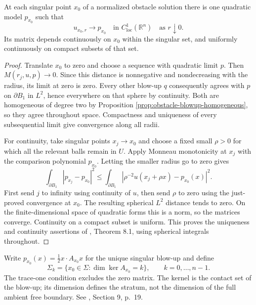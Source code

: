 \begin{theorem}\label{thm:obstacle-singular-uniqueness}
At each singular point $x_0$ of a normalized obstacle solution there is one quadratic model $p_{x_0}$ such that
\[
 u_{x_0,r}\longrightarrow p_{x_0}\quad\text{in }C^1_{\mathrm{loc}}(\mathbb R^n)
 \quad\text{as }r\downarrow0.
\]
Its matrix depends continuously on $x_0$ within the singular set, and uniformly continuously on compact subsets of that set.
\end{theorem}
\begin{proof}
Translate $x_0$ to zero and choose a sequence with quadratic limit $p$. Then $M(r_j,u,p)\to0$. Since this distance is nonnegative and nondecreasing with the radius, its limit at zero is zero. Every other blow-up $q$ consequently agrees with $p$ on $\partial B_1$ in $L^2$, hence everywhere on that sphere by continuity. Both are homogeneous of degree two by Proposition \ref{prop:obstacle-blowup-homogeneous}, so they agree throughout space. Compactness and uniqueness of every subsequential limit give convergence along all radii.

For continuity, take singular points $x_j\to x_0$ and choose a fixed small $\rho>0$ for which all the relevant balls remain in $U$. Apply Monneau monotonicity at $x_j$ with the comparison polynomial $p_{x_0}$. Letting the smaller radius go to zero gives
\[
 \int_{\partial B_1}|p_{x_j}-p_{x_0}|^2
 \leq\int_{\partial B_1}
 \left|\rho^{-2}u(x_j+\rho x)-p_{x_0}(x)\right|^2.
\]
First send $j$ to infinity using continuity of $u$, then send $\rho$ to zero using the just-proved convergence at $x_0$. The resulting spherical $L^2$ distance tends to zero. On the finite-dimensional space of quadratic forms this is a norm, so the matrices converge. Continuity on a compact subset is uniform. This proves the uniqueness and continuity assertions of \cite{Fig18}, Theorem 8.1, using spherical integrals throughout.
\end{proof}

\begin{definition}\label{def:obstacle-singular-strata}
Write $p_{x_0}(x)=\frac12x\cdot A_{x_0}x$ for the unique singular blow-up and define
\[
 \Sigma_k=\{x_0\in\Sigma:\dim\ker A_{x_0}=k\},
 \qquad k=0,\ldots,n-1.
\]
The trace-one condition excludes the zero matrix. The kernel is the contact set of the blow-up; its dimension defines the stratum, not the dimension of the full ambient free boundary. See \cite{Fig18}, Section 9, p.~19.
\end{definition}

